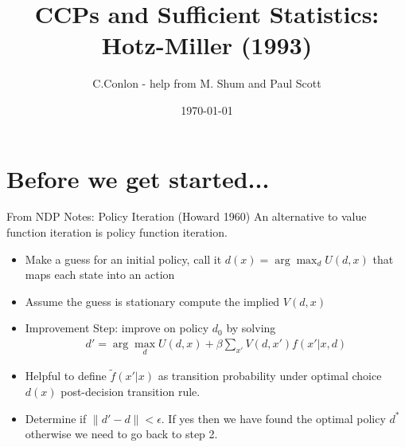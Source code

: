 \documentclass[aspectratio=169,11pt]{beamer}
\title{CCPs and Sufficient Statistics: Hotz-Miller (1993)}
\author{C.Conlon - help from M. Shum and Paul Scott}
\institute{Grad IO }
\date{\today}
\begin{document}
\begin{frame}
\titlepage
\end{frame}


\section{Before we get started...}

\begin{frame}{From NDP Notes: Policy Iteration (Howard 1960)}
An alternative to value function iteration is policy function iteration. 
\begin{itemize}
\item Make a guess for an initial policy, call it $d(x) = \arg \max_d U(d,x)$ that maps each state into an action
\item Assume the guess is stationary compute the implied $V(d,x)$
\item Improvement Step: improve on policy $d_0$ by solving 
\begin{eqnarray*}
d' = \arg \max_d U(d,x) + \beta \sum_{x'} V(d,x') f (x' | x,d)
\end{eqnarray*}
\item Helpful to define $\tilde{f}(x' | x)$ as transition probability under optimal choice $d(x)$ \alert{post-decision transition rule}.
\item Determine if $\| d' -d\| < \epsilon$. If yes then we have found the optimal policy $d^* $ otherwise we need to go back to step 2.
\end{itemize}
\end{frame}
\end{document}
